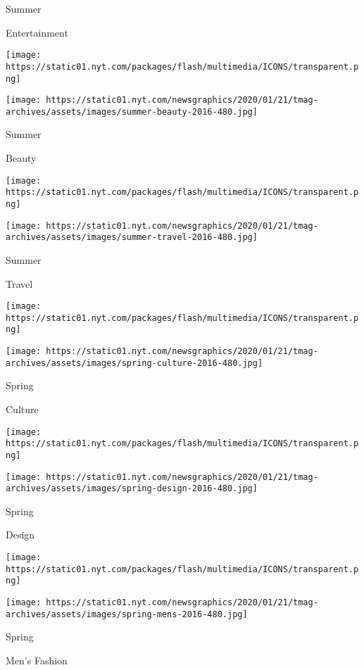 Summer

Entertainment

\href{https://www.nytimes.com/issue/t-magazine/2016/06/12/beauty}{}

\texttt{[image: https://static01.nyt.com/packages/flash/multimedia/ICONS/transparent.png]}

\texttt{[image: https://static01.nyt.com/newsgraphics/2020/01/21/tmag-archives/assets/images/summer-beauty-2016-480.jpg]}

Summer

Beauty

\href{https://www.nytimes.com/issue/t-magazine/2016/05/22/travel}{}

\texttt{[image: https://static01.nyt.com/packages/flash/multimedia/ICONS/transparent.png]}

\texttt{[image: https://static01.nyt.com/newsgraphics/2020/01/21/tmag-archives/assets/images/summer-travel-2016-480.jpg]}

Summer

Travel

\href{https://www.nytimes.com/issue/t-magazine/2016/04/17/culture}{}

\texttt{[image: https://static01.nyt.com/packages/flash/multimedia/ICONS/transparent.png]}

\texttt{[image: https://static01.nyt.com/newsgraphics/2020/01/21/tmag-archives/assets/images/spring-culture-2016-480.jpg]}

Spring

Culture

\href{https://www.nytimes.com/issue/t-magazine/design/2016/03/20/t-design}{}

\texttt{[image: https://static01.nyt.com/packages/flash/multimedia/ICONS/transparent.png]}

\texttt{[image: https://static01.nyt.com/newsgraphics/2020/01/21/tmag-archives/assets/images/spring-design-2016-480.jpg]}

Spring

Design

\href{https://www.nytimes.com/issue/t-magazine/2016/03/06/men-spring-fashion}{}

\texttt{[image: https://static01.nyt.com/packages/flash/multimedia/ICONS/transparent.png]}

\texttt{[image: https://static01.nyt.com/newsgraphics/2020/01/21/tmag-archives/assets/images/spring-mens-2016-480.jpg]}

Spring

Men's Fashion

